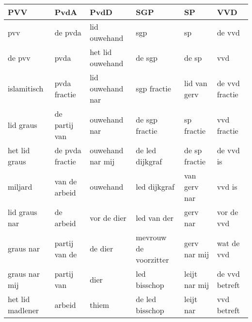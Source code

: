 \begin{tabular}{llllll}
\toprule
              PVV &             PvdA &              PvdD &                    SGP &             SP &             VVD \\
\midrule
              pvv &          de pvda &      lid ouwehand &                    sgp &             sp &          de vvd \\
           de pvv &             pvda &  het lid ouwehand &                 de sgp &          de sp &             vvd \\
      islamitisch &     pvda fractie &  lid ouwehand nar &            sgp fractie &   lid van gerv &  de vvd fractie \\
        lid graus &    de partij van &      ouwehand nar &         de sgp fractie &     sp fractie &     vvd fractie \\
    het lid graus &  de pvda fractie &  ouwehand nar mij &        de led dijkgraf &  de sp fractie &       de vvd is \\
          miljard &    van de arbeid &          ouwehand &           led dijkgraf &   van gerv nar &          vvd is \\
    lid graus nar &        de arbeid &       vor de dier &            led van der &       gerv nar &      vor de vvd \\
        graus nar &    partij van de &           de dier &  mevrouw de voorzitter &   gerv nar mij &      wat de vvd \\
    graus nar mij &       partij van &              dier &           led bisschop &  leijt nar mij &  de vvd betreft \\
 het lid madlener &           arbeid &             thiem &        de led bisschop &      leijt nar &     vvd betreft \\
\bottomrule
\end{tabular}
